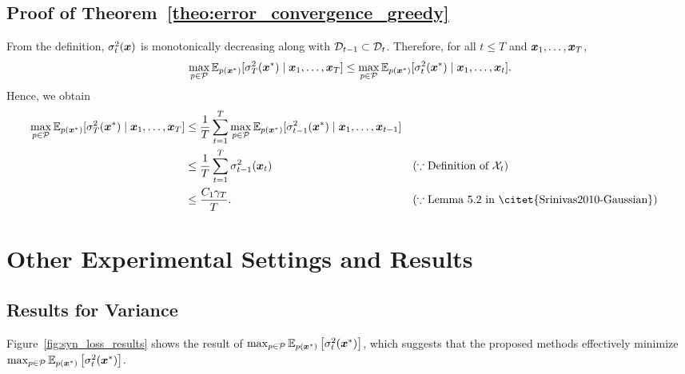 \subsection{Proof of Theorem~\ref{theo:error_convergence_greedy}}

From the definition, $\sigma_t^2(\boldsymbol{x})$ is monotonically decreasing along with ${\cal D}_{t-1} \subset {\cal D}_t$.
%
Therefore, for all $t \leq T$ and $\boldsymbol{x}_1, \dots, \boldsymbol{x}_T$, 
\begin{align*}
    \max_{p \in {\cal P}} \mathbb{E}_{p(\boldsymbol{x}^*)}[\sigma_{T}^2(\boldsymbol{x}^*) \mid \boldsymbol{x}_1, \dots, \boldsymbol{x}_T]
    \leq 
    \max_{p \in {\cal P}} \mathbb{E}_{p(\boldsymbol{x}^*)}[\sigma_{t}^2(\boldsymbol{x}^*) \mid \boldsymbol{x}_1, \dots, \boldsymbol{x}_t].
\end{align*}
%
Hence, we obtain
\begin{align*}
    \max_{p \in \cP} \EE_{p(\*x^*)}[\sigma_{T}^2(\*x^*) \mid \*x_1, \dots, \*x_T]
    &\leq 
    \frac{1}{T} \sum_{t=1}^T
    \max_{p \in \cP} \EE_{p(\*x^*)}[\sigma_{t-1}^2(\*x^*) \mid \*x_1, \dots, \*x_{t-1}] \\
    &\leq
    \frac{1}{T} \sum_{t=1}^T \sigma_{t-1}^2(\*x_t) && (\because \text{Definition of $\cX_t$}) \\
    &\leq \frac{C_1 \gamma_T}{T}. && (\because \text{Lemma~5.2 in \citet{Srinivas2010-Gaussian}})
\end{align*}

\section{Other Experimental Settings and Results}
\label{sec:exp_settings}



\subsection{Results for Variance}
\label{sec:exp_variance}

Figure~\ref{fig:syn_loss_results} shows the result of $\max_{p \in {\cal P}} \mathbb{E}_{p(\boldsymbol{x}^*)} \left[ \sigma_t^2 (\boldsymbol{x}^*) \right]$, which suggests that the proposed methods effectively minimize $\max_{p \in {\cal P}} \mathbb{E}_{p(\boldsymbol{x}^*)} \left[ \sigma_t^2 (\boldsymbol{x}^*) \right]$.

